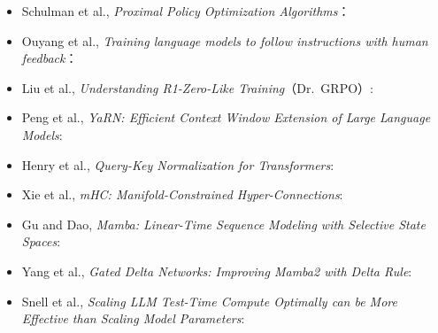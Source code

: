 \begin{itemize}
\item {}\label{source:ppo}Schulman et al., \emph{Proximal Policy Optimization Algorithms}：
\item {}\label{source:rlhf-ppo}Ouyang et al., \emph{Training language models to follow instructions with human feedback}：
\item Liu et al., \emph{Understanding R1-Zero-Like Training}（Dr.~GRPO）:
\item {}\label{source:yarn}Peng et al., \emph{YaRN: Efficient Context Window Extension of Large Language Models}:
\item {}\label{source:qk-norm}Henry et al., \emph{Query-Key Normalization for Transformers}:
\item {}\label{source:mhc}Xie et al., \emph{mHC: Manifold-Constrained Hyper-Connections}:
\item {}\label{source:mamba}Gu and Dao, \emph{Mamba: Linear-Time Sequence Modeling with Selective State Spaces}:
\item {}\label{source:gated-delta}Yang et al., \emph{Gated Delta Networks: Improving Mamba2 with Delta Rule}:
\item {}\label{source:test-time-compute}Snell et al., \emph{Scaling LLM Test-Time Compute Optimally can be More Effective than Scaling Model Parameters}:
\end{itemize}

